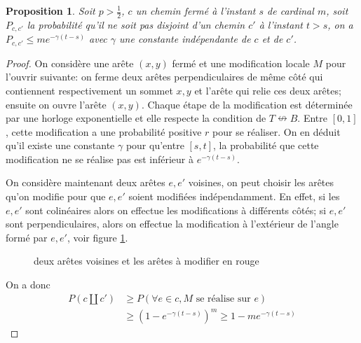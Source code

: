 \documentclass[titlepage,a4paper,11pt]{article}
\newcounter{prop}
\newtheorem{decexp}[prop]{Proposition}
\newcommand{\nconnect}{\nleftrightarrow}
\begin{document}
\begin{decexp}
Soit $p>\frac{1}{2}$, $c$ un chemin fermé à l'instant $s$ de cardinal $m$, soit $P_{c,c'}$ la probabilité qu'il ne soit pas disjoint d'un chemin $c'$ à l'instant $t>s$, on a $P_{c,c'}\leqslant me^{-\gamma(t-s)}$ avec $\gamma$ une constante indépendante de $c$ et de $c'$.
\end{decexp}
\begin{proof}
On considère une arête $(x,y)$ fermé et une modification locale $M$ pour l'ouvrir suivante: on ferme deux arêtes perpendiculaires de même côté qui contiennent respectivement un sommet $x,y$ et l'arête qui relie ces deux arêtes; ensuite on ouvre l'arête $(x,y)$. Chaque étape de la modification est déterminée par une horloge exponentielle et elle respecte la condition de $T\nconnect B$. Entre $[0,1]$, cette modification a une probabilité positive $r$ pour se réaliser. On en déduit qu'il existe une constante $\gamma$ pour qu'entre $[s,t]$, la probabilité que cette modification ne se réalise pas est inférieur à $e^{-\gamma(t-s)}$. 

On considère maintenant deux arêtes $e,e'$ voisines, on peut choisir les arêtes qu'on modifie pour que $e,e'$ soient modifiées indépendamment. En effet, si les $e,e'$ sont colinéaires alors on effectue les modifications à différents côtés; si $e,e'$ sont perpendiculaires, alors on effectue la modification à l'extérieur de l'angle formé par $e,e'$, voir figure \ref{fig:mod}.

\begin{figure}[h]

\begin{minipage}{0.45\linewidth}
\center
{}
\end{minipage}
\hfill
\begin{minipage}{0.45\linewidth}
\center
{}
\end{minipage}
\caption{deux arêtes voisines et les arêtes à modifier en rouge}
\label{fig:mod}

\end{figure}

On a donc 
\begin{align*}
 P(c \coprod c') &\geqslant P(\forall e \in c, M \text{ se réalise sur } e) \\
 & \geqslant (1-e^{-\gamma (t-s)})^m \geqslant 1-me^{-\gamma (t-s)}
\end{align*} 
\end{proof}
\end{document}
